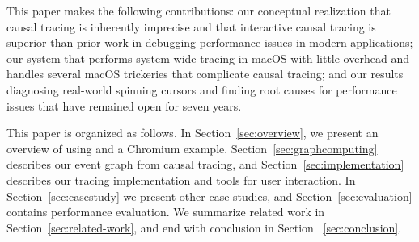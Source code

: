 This paper makes the following contributions: our conceptual realization that
causal tracing is inherently imprecise and that interactive causal tracing is
superior than prior work in debugging performance issues in modern
applications; our system \xxx that performs system-wide tracing in macOS with
little overhead and handles several macOS trickeries that complicate
causal tracing; and our results diagnosing real-world spinning cursors and
finding root causes for performance issues that have remained open for
seven years.

This paper is organized as follows. In Section~\ref{sec:overview}, we present
an overview of using \xxx and a Chromium example.
Section~\ref{sec:graphcomputing} describes our event graph from causal tracing,
and Section~\ref{sec:implementation} describes our
tracing implementation and tools for user interaction.
In Section~\ref{sec:casestudy} we present other case
studies, and Section~\ref{sec:evaluation} contains performance evaluation.
We summarize related work in Section~\ref{sec:related-work}, and end with
conclusion in Section ~\ref{sec:conclusion}.
